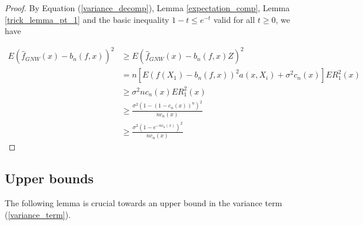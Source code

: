 \documentclass{article}
\begin{document}
\begin{proof}
By Equation (\ref{variance_decomp}), Lemma
\ref{expectation_comp}, Lemma  
\ref{trick_lemma_pt_1} and the basic inequality  $1-t\leq e^{-t}$ valid for all $t\geq 0$, we have

\begin{equation}
\begin{split}
E(\hat{f}_{GNW}(x)-b_n(f,x))^2&\geq E(\hat{f}_{GNW}(x)-b_n(f,x)Z)^2\\
&=n[E(f(X_1)-b_n(f,x))^2a(x,X_i)+\sigma^2c_n(x)]ER_1^2(x)\\
&\geq \sigma^2nc_n(x)ER_1^2(x)\\
&\geq \frac{\sigma^2(1-(1-c_n(x))^n)^2}{nc_n(x)}\\
&\geq \frac{\sigma^2(1-e^{-nc_n(x)})^2}{nc_n(x)}
\end{split}
\end{equation}

\end{proof}

\subsection{Upper bounds}

The following lemma is crucial towards an upper bound in the variance term (\ref{variance_term}).
\end{document}
